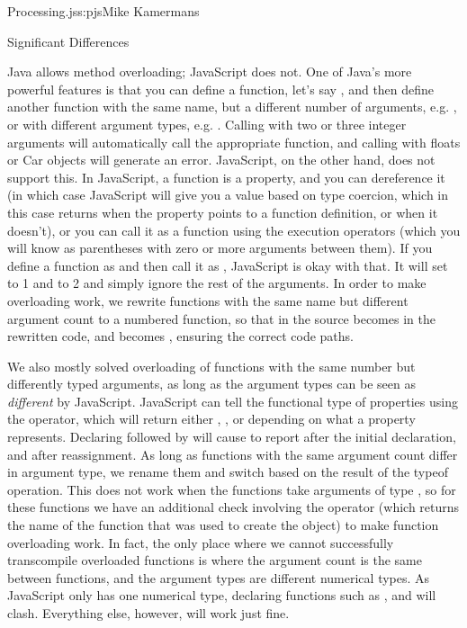 \begin{aosachapter}{Processing.js}{s:pjs}{Mike Kamermans}
\begin{aosasect1}{Significant Differences}
\begin{aosasect3}{Java allows method overloading; JavaScript does not.}
One of Java's more powerful features is that you can define a
function, let's say , and then define another function
with the same name, but a different number of arguments, e.g. , or with different argument types, e.g. 
. Calling  with two or three integer arguments will
automatically call the appropriate function, and calling  with
floats or Car objects will generate an error. JavaScript, on the other
hand, does not support this. In JavaScript, a function is a property,
and you can dereference it (in which case JavaScript will give you a
value based on type coercion, which in this case returns  when
the property points to a function definition, or  when it
doesn't), or you can call it as a function using the execution
operators (which you will know as parentheses with zero or more
arguments between them). If you define a function as  and then
call it as , JavaScript is okay with that. It will set 
to 1 and  to 2 and simply ignore the rest of the arguments. In order
to make overloading work, we rewrite functions with the same name but
different argument count to a numbered function, so that
 in the source becomes  in the
rewritten code, and  becomes ,
ensuring the correct code paths.

We also mostly solved overloading of functions with the same number
but differently typed arguments, as long as the argument types can be
seen as \emph{different} by JavaScript. JavaScript can tell the functional
type of properties using the  operator, which will return
either , ,  or  depending on what a
 property represents. Declaring  followed by  will
cause  to report  after the initial declaration, and
 after reassignment. As long as functions with the same
argument count differ in argument type, we rename them and switch
based on the result of the typeof operation. This does not work when
the functions take arguments of type , so for these functions
we have an additional check involving the  operator
(which returns the name of the function that was used to create the
object) to make function overloading work. In fact, the only place
where we cannot successfully transcompile overloaded functions is
where the argument count is the same between functions, and the
argument types are different numerical types. As JavaScript only has
one numerical type, declaring functions such as ,
 and  will
clash. Everything else, however, will work just fine.


\end{aosasect3}
\end{aosasect1}
\end{aosachapter}
